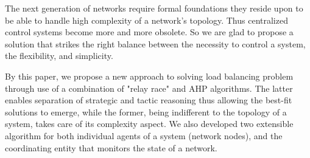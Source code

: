 The next generation of networks require formal foundations they reside upon to be able to handle high complexity of a network's topology.
Thus centralized control systems become more and more obsolete.
So we are glad to propose a solution that strikes the right balance between the necessity to control a system, the flexibility, and simplicity.

By this paper, we propose a new approach to solving load balancing problem through use of a combination of "relay race" and AHP algorithms.
The latter enables separation of strategic and tactic reasoning thus allowing the best-fit solutions to emerge, while the former, being indifferent to the topology of a system, takes care of its complexity aspect.
We also developed two extensible algorithm for both individual agents of a system (network nodes), and the coordinating entity that monitors the state of a network.
